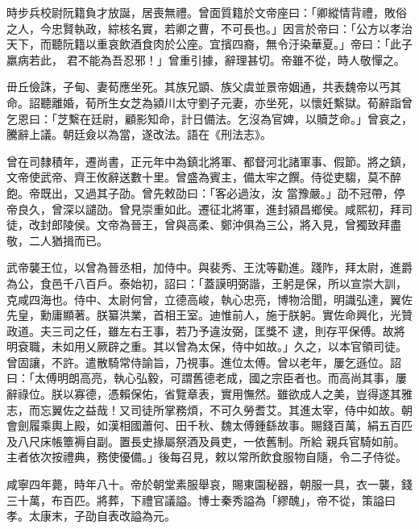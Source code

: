\begin{pinyinscope}
 時步兵校尉阮籍負才放誕，居喪無禮。曾面質籍於文帝座曰：「卿縱情背禮，敗俗之人，今忠賢執政，綜核名實，若卿之曹，不可長也。」因言於帝曰：「公方以孝治天下，而聽阮籍以重哀飲酒食肉於公座。宜擯四裔，無令汙染華夏。」帝曰：「此子羸病若此，
 君不能為吾忍邪！」曾重引據，辭理甚切。帝雖不從，時人敬憚之。



 毌丘儉誅，子甸、妻荀應坐死。其族兄顗、族父虞並景帝姻通，共表魏帝以丐其命。詔聽離婚，荀所生女芝為潁川太守劉子元妻，亦坐死，以懷妊繫獄。荀辭詣曾乞恩曰：「芝繫在廷尉，顧影知命，計日備法。乞沒為官婢，以贖芝命。」曾哀之，騰辭上議。朝廷僉以為當，遂改法。語在《刑法志》。



 曾在司隸積年，遷尚書，正元年中為鎮北將軍、都督河北諸軍事、假節。將之鎮，文帝使武帝、齊王攸辭送數十里。曾盛為賓主，備太牢之饌。侍從吏騶，莫不醉飽。帝既出，又過其子劭。曾先敕劭曰：「客必過汝，汝
 當豫嚴。」劭不冠帶，停帝良久，曾深以譴劭。曾見崇重如此。遷征北將軍，進封潁昌鄉侯。咸熙初，拜司徒，改封郎陵侯。文帝為晉王，曾與高柔、鄭沖俱為三公，將入見，曾獨致拜盡敬，二人猶揖而已。



 武帝襲王位，以曾為晉丞相，加侍中。與裴秀、王沈等勸進。踐阼，拜太尉，進爵為公，食邑千八百戶。泰始初，詔曰：「蓋謨明弼諧，王躬是保，所以宣崇大訓，克咸四海也。侍中、太尉何曾，立德高峻，執心忠亮，博物洽聞，明識弘達，翼佐先皇，勳庸顯著。朕纂洪業，首相王室。迪惟前人，施于朕躬。實佐命興化，光贊政道。夫三司之任，雖左右王事，若乃予違汝弼，匡獎不
 逮，則存平保傅。故將明袞職，未如用乂厥辟之重。其以曾為太保，侍中如故。」久之，以本官領司徒。曾固讓，不許。遣散騎常侍諭旨，乃視事。進位太傅。曾以老年，屢乞遜位。詔曰：「太傅明朗高亮，執心弘毅，可謂舊德老成，國之宗臣者也。而高尚其事，屢辭祿位。朕以寡德，憑賴保佑，省覽章表，實用憮然。雖欲成人之美，豈得遂其雅志，而忘翼佐之益哉！又司徒所掌務煩，不可久勞耆艾。其進太宰，侍中如故。朝會劍履乘輿上殿，如漢相國蕭何、田千秋、魏太傅鍾繇故事。賜錢百萬，絹五百匹及八尺床帳簟褥自副。置長史掾屬祭酒及員吏，一依舊制。所給
 親兵官騎如前。主者依次按禮典，務使優備。」後每召見，敕以常所飲食服物自隨，令二子侍從。



 咸寧四年薨，時年八十。帝於朝堂素服舉哀，賜東園秘器，朝服一具，衣一襲，錢三十萬，布百匹。將葬，下禮官議謚。博士秦秀謚為「繆醜」，帝不從，策謚曰孝。太康末，子劭自表改謚為元。




\end{pinyinscope}
